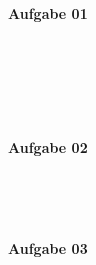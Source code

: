 \documentclass[a4paper,10pt]{article}
\begin{document}
	\parindent0pt
	\textbf{Aufgabe 01}
	\begin{compactenum} [(a)]
		\item \begin{compactenum} [(i)]
			\item 
			\item 
		\end{compactenum} \
		\item \begin{compactenum} [(i)]
		\item 
		\item 
		\end{compactenum} \
	\end{compactenum} \
	
	\textbf{Aufgabe 02}
	\begin{compactenum} [(a)]
		\item \begin{compactenum} [(i)]
			\item 
			\item 
			\item 
		\end{compactenum} \
		\item \begin{compactenum} [(i)]
			\item 
			\item 
			\item 
			\item 
		\end{compactenum} 
	\end{compactenum} \
	
	\textbf{Aufgabe 03}
	\begin{compactenum} [(a)]
		\item 
		\item 
	\end{compactenum} \
\end{document}
